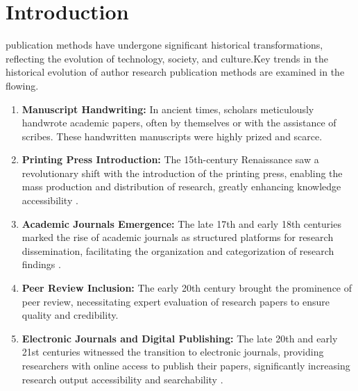 \documentclass[lettersize,journal]{IEEEtran}
\begin{document}
\section{Introduction}
 publication methods have undergone significant historical transformations, reflecting the evolution of technology, society, and culture.Key trends in the historical evolution of author research publication methods are examined in the flowing.
\begin{enumerate}
  \item \textbf{Manuscript Handwriting:} In ancient times, scholars meticulously handwrote academic papers, often by themselves or with the assistance of scribes. These handwritten manuscripts were highly prized and scarce.
  
  \item \textbf{Printing Press Introduction:} The 15th-century Renaissance saw a revolutionary shift with the introduction of the printing press, enabling the mass production and distribution of research, greatly enhancing knowledge accessibility \cite{febvre1997coming}.

  \item \textbf{Academic Journals Emergence:} The late 17th and early 18th centuries marked the rise of academic journals as structured platforms for research dissemination, facilitating the organization and categorization of research findings \cite{willinsky2006access}.

  \item \textbf{Peer Review Inclusion:} The early 20th century brought the prominence of peer review, necessitating expert evaluation of research papers to ensure quality and credibility.

  \item \textbf{Electronic Journals and Digital Publishing:} The late 20th and early 21st centuries witnessed the transition to electronic journals, providing researchers with online access to publish their papers, significantly increasing research output accessibility and searchability \cite{meadows1997communicating}.


\end{enumerate}
\end{document}
